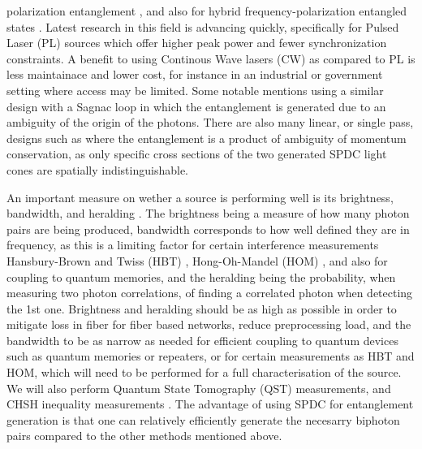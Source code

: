 \documentclass{article}
\theoremstyle{mytheoremstyle}
\theoremstyle{mytheoremstyle}
\theoremstyle{myproblemstyle}
\begin{document}
polarization entanglement \cite{L_Z_F_F_L_L_W_R_D_X_etal._2017}, and also for hybrid frequency-polarization
entangled states \cite{F_R_D_F_L_M_A_B_D_2023}. Latest research in this field is advancing quickly, specifically for
Pulsed Laser (PL) sources which offer higher peak power and fewer synchronization constraints.
A benefit to using Continous Wave lasers (CW) as compared to PL is less maintainace and lower cost, for instance in an industrial or government
setting where access may be limited. Some notable mentions using a similar design with a Sagnac loop
\cite{Neumann_Buchner_Bulla_Bohmann_Ursin_2022_CW,Chen_Ecker_Wengerowsky_Bulla_Joshi_Steinlechner_Ursin_2018_CW}
in which the entanglement is generated due to an ambiguity of the origin of the photons.
There are also many linear, or single pass, designs such as \cite{Lee_Kim_Cha_Moon_2016,Kwiat_Mattle_Weinfurter_Zeilinger_Sergienko_Shih_1995}
where the entanglement is a product of ambiguity of momentum conservation, as only specific cross sections of the two generated SPDC light
cones are spatially indistinguishable.
\par An important measure on wether a source is performing well is its brightness, bandwidth, and heralding \cite{Bennink_2010,Ljunggren_Tengner_Marsden_Pelton_2006}.
The brightness being a measure of how many photon pairs are being produced, bandwidth corresponds to how well defined they are in frequency,
as this is a limiting factor for certain interference measurements Hansbury-Brown and Twiss (HBT) \cite{Brown_Twiss_1954},
Hong-Oh-Mandel (HOM) \cite{Hong_Ou_Mandel_1987}, and also for coupling to quantum memories,
and the heralding being the probability, when measuring two photon correlations, of finding a correlated photon when detecting the 1st one.
Brightness and heralding should be as high as possible in order to mitigate loss in fiber for fiber based networks,
reduce preprocessing load, and the bandwidth to be as narrow as needed for efficient coupling to quantum devices such as quantum memories or repeaters,
or for certain measurements as HBT and HOM, which will need to be performed for a full characterisation of the source.
We will also perform Quantum State Tomography (QST) measurements, and CHSH inequality measurements \cite{Clauser_Horne_Shimony_Holt_1969}.
The advantage of using SPDC for entanglement generation is that one can relatively efficiently generate the necesarry biphoton pairs
compared to the other methods mentioned above.
\end{document}
